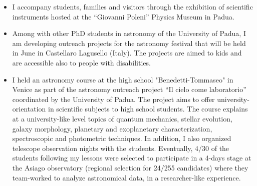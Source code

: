 %
%
%


\begin{experiences}
    
     {}{
     \begin{itemize}
         \item I accompany students, families and visitors through the exhibition of scientific instruments hosted at the ``Giovanni Poleni'' Physics Museum in Padua.
     \end{itemize}}
    \emptySeparator
     {}{
     \begin{itemize}
         \item Among with other PhD students in astronomy of the University of Padua, I am developing outreach projects for the astronomy festival that will be held in June in Castellaro Lagusello (Italy). The projects are aimed to kids and are accessible also to people with disabilities.
     \end{itemize}}
    \emptySeparator
     {}{
     \begin{itemize}
         \item I held an astronomy course at the high school "Benedetti-Tommaseo" in Venice as part of the astronomy outreach project ``Il cielo come laboratorio'' coordinated by the University of Padua. The project aims to offer university-orientation in scientific subjects to high school students. The course explains at a university-like level topics of quantum mechanics, stellar evolution, galaxy morphology, planetary and exoplanetary characterization, spectroscopic and photometric techniques. In addition, I also organized telescope observation nights with the students. Eventually, 4/30 of the students following my lessons were selected to participate in a 4-days stage at the Asiago observatory (regional selection for 24/255 candidates) where they team-worked to analyze astronomical data, in a researcher-like experience.

\end{itemize}}
\end{experiences}
